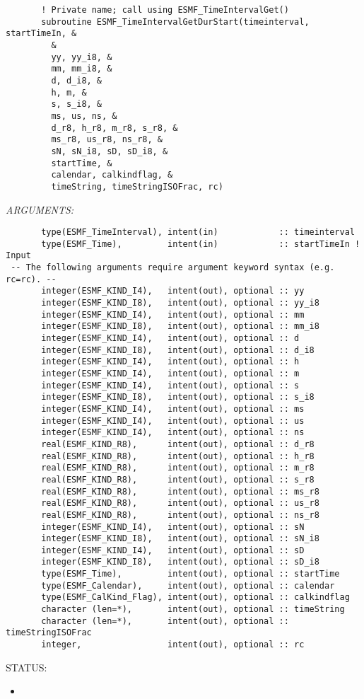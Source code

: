  
\begin{verbatim}       ! Private name; call using ESMF_TimeIntervalGet()
       subroutine ESMF_TimeIntervalGetDurStart(timeinterval, startTimeIn, &
         &
         yy, yy_i8, &
         mm, mm_i8, &
         d, d_i8, &
         h, m, &
         s, s_i8, &
         ms, us, ns, &
         d_r8, h_r8, m_r8, s_r8, &
         ms_r8, us_r8, ns_r8, &
         sN, sN_i8, sD, sD_i8, &
         startTime, &
         calendar, calkindflag, &
         timeString, timeStringISOFrac, rc)
 \end{verbatim}{\em ARGUMENTS:}
\begin{verbatim}       type(ESMF_TimeInterval), intent(in)            :: timeinterval
       type(ESMF_Time),         intent(in)            :: startTimeIn ! Input
 -- The following arguments require argument keyword syntax (e.g. rc=rc). --
       integer(ESMF_KIND_I4),   intent(out), optional :: yy
       integer(ESMF_KIND_I8),   intent(out), optional :: yy_i8
       integer(ESMF_KIND_I4),   intent(out), optional :: mm
       integer(ESMF_KIND_I8),   intent(out), optional :: mm_i8
       integer(ESMF_KIND_I4),   intent(out), optional :: d
       integer(ESMF_KIND_I8),   intent(out), optional :: d_i8
       integer(ESMF_KIND_I4),   intent(out), optional :: h
       integer(ESMF_KIND_I4),   intent(out), optional :: m
       integer(ESMF_KIND_I4),   intent(out), optional :: s
       integer(ESMF_KIND_I8),   intent(out), optional :: s_i8
       integer(ESMF_KIND_I4),   intent(out), optional :: ms
       integer(ESMF_KIND_I4),   intent(out), optional :: us
       integer(ESMF_KIND_I4),   intent(out), optional :: ns
       real(ESMF_KIND_R8),      intent(out), optional :: d_r8
       real(ESMF_KIND_R8),      intent(out), optional :: h_r8
       real(ESMF_KIND_R8),      intent(out), optional :: m_r8
       real(ESMF_KIND_R8),      intent(out), optional :: s_r8
       real(ESMF_KIND_R8),      intent(out), optional :: ms_r8
       real(ESMF_KIND_R8),      intent(out), optional :: us_r8
       real(ESMF_KIND_R8),      intent(out), optional :: ns_r8
       integer(ESMF_KIND_I4),   intent(out), optional :: sN
       integer(ESMF_KIND_I8),   intent(out), optional :: sN_i8
       integer(ESMF_KIND_I4),   intent(out), optional :: sD
       integer(ESMF_KIND_I8),   intent(out), optional :: sD_i8
       type(ESMF_Time),         intent(out), optional :: startTime
       type(ESMF_Calendar),     intent(out), optional :: calendar
       type(ESMF_CalKind_Flag), intent(out), optional :: calkindflag
       character (len=*),       intent(out), optional :: timeString
       character (len=*),       intent(out), optional :: timeStringISOFrac
       integer,                 intent(out), optional :: rc
 \end{verbatim}
{\sf STATUS:}
   \begin{itemize}
   \item{}
   \end{itemize}
  
